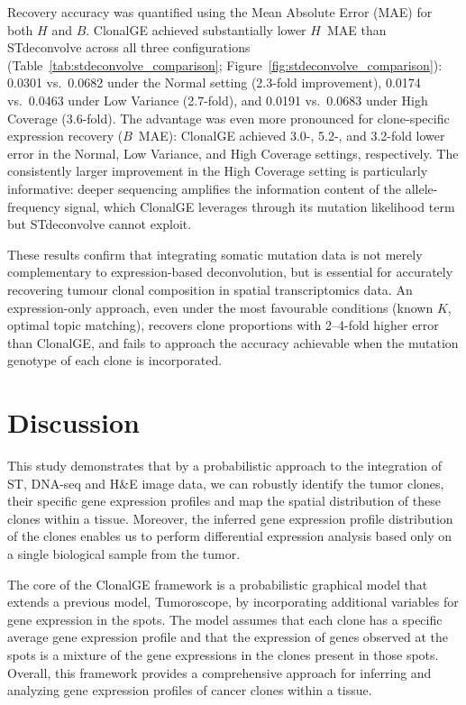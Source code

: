 \documentclass[unnumsec,webpdf,contemporary,large]{oup-authoring-template}%
\theoremstyle{thmstyleone}%
\theoremstyle{thmstyletwo}%
\theoremstyle{thmstylethree}%
\begin{document}
Recovery accuracy was quantified using the Mean Absolute Error (MAE)
for both $H$ and $B$.
%
ClonalGE achieved substantially lower $H$~MAE than STdeconvolve across
all three configurations (Table~\ref{tab:stdeconvolve_comparison};
Figure~\ref{fig:stdeconvolve_comparison}): \num{0.0301} vs.\ \num{0.0682}
under the Normal setting (2.3-fold improvement), \num{0.0174} vs.\
\num{0.0463} under Low Variance (2.7-fold), and \num{0.0191} vs.\
\num{0.0683} under High Coverage (3.6-fold).
%
The advantage was even more pronounced for clone-specific expression
recovery ($B$~MAE): ClonalGE achieved 3.0-, 5.2-, and 3.2-fold lower
error in the Normal, Low Variance, and High Coverage settings,
respectively.
%
The consistently larger improvement in the High Coverage setting is
particularly informative: deeper sequencing amplifies the information
content of the allele-frequency signal, which ClonalGE leverages
through its mutation likelihood term but STdeconvolve cannot exploit.

These results confirm that integrating somatic mutation data is not merely
complementary to expression-based deconvolution, but is essential for
accurately recovering tumour clonal composition in spatial transcriptomics
data.
%
An expression-only approach, even under the most favourable conditions
(known $K$, optimal topic matching), recovers clone proportions with
2--4-fold higher error than ClonalGE, and fails to approach the accuracy
achievable when the mutation genotype of each clone is incorporated.




\section{Discussion}

This study demonstrates that by a probabilistic approach to the integration of ST,   DNA-seq  and H\&E image data, we can robustly identify the tumor clones, their specific gene expression profiles and map the spatial distribution of these clones within a tissue. Moreover, the inferred gene expression profile distribution of the clones enables us to perform differential expression analysis based only on a single biological sample from the tumor. 

The core of the ClonalGE framework is a probabilistic graphical model that extends a previous model, Tumoroscope, by incorporating additional variables for gene expression in the spots. The model assumes that each clone has a specific average gene expression profile and that the expression of genes observed at the spots is a mixture of the gene expressions in the clones present in those spots. Overall, this framework provides a comprehensive approach for inferring and analyzing gene expression profiles of cancer clones within a tissue.
\end{document}
